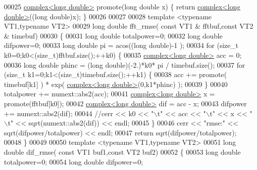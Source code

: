 \begin{DoxyCode}
00025 \hyperlink{structcomplex}{complex<long double>}  promote(\textcolor{keywordtype}{long} \textcolor{keywordtype}{double} x) \{ \textcolor{keywordflow}{return} 
      \hyperlink{structcomplex}{complex<long double>}((\textcolor{keywordtype}{long} double)x); \}
00026     
00027 
00028     \textcolor{keyword}{template} <\textcolor{keyword}{typename} VT1,\textcolor{keyword}{typename} VT2>
00029     \textcolor{keywordtype}{long} \textcolor{keywordtype}{double} fft\_rmse( \textcolor{keyword}{const} VT1 & fftbuf,\textcolor{keyword}{const} VT2 & timebuf)
00030     \{
00031         \textcolor{keywordtype}{long} \textcolor{keywordtype}{double} totalpower=0;
00032         \textcolor{keywordtype}{long} \textcolor{keywordtype}{double} difpower=0;
00033         \textcolor{keywordtype}{long} \textcolor{keywordtype}{double} pi = acos((\textcolor{keywordtype}{long} \textcolor{keywordtype}{double})-1 );
00034         \textcolor{keywordflow}{for} (\textcolor{keywordtype}{size\_t} k0=0;k0<(size\_t)fftbuf.size();++k0) \{
00035             \hyperlink{structcomplex}{complex<long double>} acc = 0;
00036             \textcolor{keywordtype}{long} \textcolor{keywordtype}{double} phinc = (\textcolor{keywordtype}{long} double)(-2.)*k0* pi / timebuf.size();
00037             \textcolor{keywordflow}{for} (\textcolor{keywordtype}{size\_t} k1=0;k1<(size\_t)timebuf.size();++k1) \{
00038                 acc +=  promote( timebuf[k1] ) * exp( \hyperlink{structcomplex}{complex<long double>}(0,k1*phinc) 
      );
00039             \}
00040             totalpower += numext::abs2(acc);
00041             \hyperlink{structcomplex}{complex<long double>} x = promote(fftbuf[k0]); 
00042             \hyperlink{structcomplex}{complex<long double>} dif = acc - x;
00043             difpower += numext::abs2(dif);
00044             \textcolor{comment}{//cerr << k0 << "\(\backslash\)t" << acc << "\(\backslash\)t" <<  x << "\(\backslash\)t" << sqrt(numext::abs2(dif)) << endl;}
00045         \}
00046         cerr << \textcolor{stringliteral}{"rmse:"} << sqrt(difpower/totalpower) << endl;
00047         \textcolor{keywordflow}{return} sqrt(difpower/totalpower);
00048     \}
00049 
00050     \textcolor{keyword}{template} <\textcolor{keyword}{typename} VT1,\textcolor{keyword}{typename} VT2>
00051     \textcolor{keywordtype}{long} \textcolor{keywordtype}{double} dif\_rmse( \textcolor{keyword}{const} VT1 buf1,\textcolor{keyword}{const} VT2 buf2)
00052     \{
00053         \textcolor{keywordtype}{long} \textcolor{keywordtype}{double} totalpower=0;
00054         \textcolor{keywordtype}{long} \textcolor{keywordtype}{double} difpower=0;

\end{DoxyCode}
